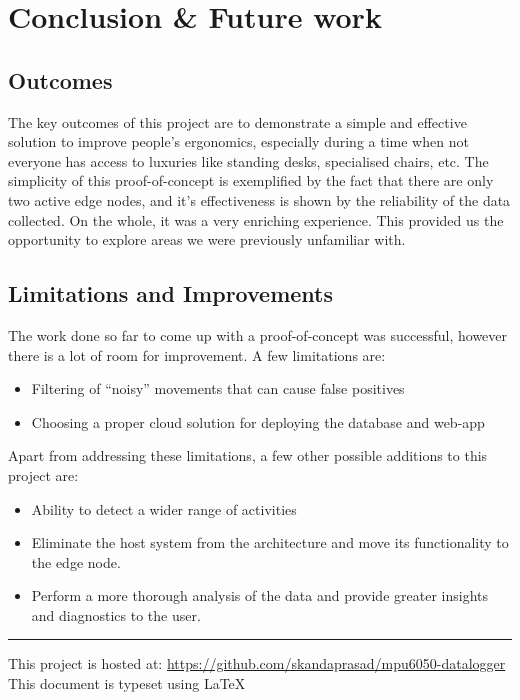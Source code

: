 \documentclass[./main.tex]{subfiles}
\begin{document}
\chapter{Conclusion \& Future work}\label{chap:concl}
\section{Outcomes}\label{sec:conclout}
The key outcomes of this project are to demonstrate a simple and effective
solution to improve people's ergonomics, especially during a time when not
everyone has access to luxuries like standing desks, specialised chairs, etc.
The simplicity of this proof-of-concept is exemplified by the fact that there
are only two active edge nodes, and it's effectiveness is shown by the
reliability of the data collected. On the whole, it was a very enriching
experience. This provided us the opportunity to explore areas we were
previously unfamiliar with.

\section{Limitations and Improvements}\label{sec:concllim}
The work done so far to come up with a proof-of-concept was successful, however
there is a lot of room for improvement. A few limitations are:
\begin{itemize}
    \item Filtering of ``noisy'' movements that can cause false positives
    \item Choosing a proper cloud solution for deploying the database and
        web-app
\end{itemize}

Apart from addressing these limitations, a few other possible additions to this
project are:
\begin{itemize}
    \item Ability to detect a wider range of activities
    \item Eliminate the host system from the architecture and move its
        functionality to the edge node.
    \item Perform a more thorough analysis of the data and provide greater
        insights and diagnostics to the user.
\end{itemize}
\vspace{2cm}

\hrule
\vspace{2cm}

\centering
This project is hosted at: \url{https://github.com/skandaprasad/mpu6050-datalogger}
\\
\vspace{0.5cm}
This document is typeset using \LaTeX
\end{document}
